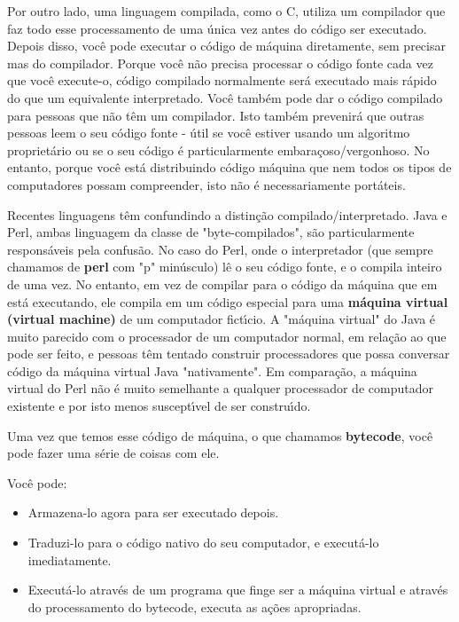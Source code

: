\documentclass[a4paper,12pt,twoside]{book}
\begin{document}
\noindent Por outro lado, uma linguagem compilada, como o C, utiliza um compilador que faz todo esse processamento 
de uma única vez antes do c\'odigo ser executado. Depois disso, voc\^e pode executar o c\'odigo de m\'aquina diretamente, 
sem precisar mas do compilador. Porque voc\^e n\~ao precisa processar o c\'odigo fonte cada vez que voc\^e execute-o, 
c\'odigo compilado normalmente ser\'a executado mais r\'apido do que um equivalente interpretado. Voc\^e tamb\'em pode dar 
o c\'odigo compilado para pessoas que n\~ao t\^em um compilador. Isto tamb\'em prevenir\'a que outras pessoas leem
o seu c\'odigo fonte - \'util se voc\^e estiver usando um algoritmo propriet\'ario ou se o seu c\'odigo \'e 
particularmente embara\c{c}oso/vergonhoso. No entanto, porque voc\^e est\'a distribuindo c\'odigo m\'aquina que nem 
todos os tipos de computadores possam compreender, isto n\~ao \'e necessariamente port\'ateis.\medskip

\noindent Recentes linguagens t\^em confundindo a distin\c{c}\~ao compilado/interpretado. Java e Perl, 
ambas linguagem da classe  de "byte-compilados", s\~ao particularmente respons\'aveis pela confus\~ao. 
No caso do Perl, onde o interpretador (que sempre chamamos de \textbf{perl} com "p" min\'usculo) l\^e 
o seu c\'odigo fonte, e o compila inteiro de uma vez. No entanto, em vez de compilar para o c\'odigo 
da m\'aquina que em est\'a executando, ele compila em um c\'odigo especial para uma \textbf{m\'aquina 
virtual (virtual machine)} de um computador fict\'{\i}cio. A "m\'aquina virtual" do Java \'e muito 
parecido com o processador de um computador normal, em rela\c{c}\~ao ao que pode ser feito, e 
pessoas t\^em tentado construir processadores que possa conversar c\'odigo da m\'aquina virtual 
Java "nativamente". Em compara\c{c}\~ao, a m\'aquina virtual do Perl n\~ao \'e muito semelhante 
a qualquer processador de  computador existente e por isto menos suscept\'{\i}vel de ser constru\'{\i}do.\medskip

\noindent Uma vez que temos esse c\'odigo de m\'aquina, o que chamamos \textbf{bytecode}, voc\^e pode 
fazer uma s\'erie de coisas com ele.\medskip

\noindent Voc\^e pode:

\begin{itemize}

 \item Armazena-lo agora para ser executado depois.

 \item Traduzi-lo para o c\'odigo nativo do seu computador, e execut\'a-lo imediatamente.

 \item Execut\'a-lo atrav\'es de um programa que finge ser a m\'aquina virtual e atrav\'es do 
processamento do bytecode, executa as a\c{c}\~oes apropriadas.

\end{itemize}
\end{document}
